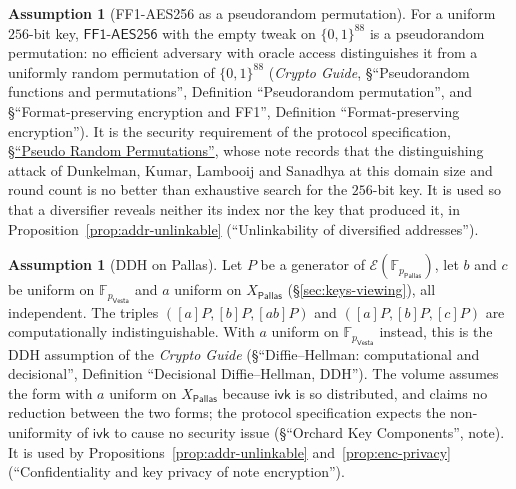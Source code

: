 \documentclass[11pt,a4paper]{article}
\theoremstyle{definition}
\newtheorem{assumption}[theorem]{Assumption}
\newcommand{\F}{\mathbb{F}}
\newcommand{\Pallas}{\ensuremath{\mathsf{Pallas}}}
\newcommand{\Vesta}{\ensuremath{\mathsf{Vesta}}}
\newcommand{\Ep}{\ensuremath{\mathcal{E}}}
\newcommand{\ivk}{\ensuremath{\mathsf{ivk}}}
\begin{document}
\begin{assumption}[FF1-AES256 as a pseudorandom permutation]%
\label{ass:ff1-prp}
For a uniform $256$-bit key, $\mathsf{FF1\text{-}AES256}$ with the empty
tweak on $\{0,1\}^{88}$ is a pseudorandom permutation: no efficient
adversary with oracle access distinguishes it from a uniformly random
permutation of $\{0,1\}^{88}$ (\emph{Crypto Guide}, \S``Pseudorandom
functions and permutations'', Definition ``Pseudorandom permutation'', and
\S``Format-preserving encryption and FF1'', Definition ``Format-preserving
encryption''). It is the security requirement of the protocol
specification,
\href{https://zips.z.cash/protocol/protocol.pdf#concreteprps}%
{\S``Pseudo Random Permutations''}, whose note records that
the distinguishing attack of Dunkelman, Kumar, Lambooij and Sanadhya at
this domain size and round count is no better than exhaustive search for
the $256$-bit key. It is used so that a
diversifier reveals neither its index nor the key that produced it, in
Proposition~\ref{prop:addr-unlinkable} (``Unlinkability of diversified
addresses'').
\end{assumption}

\begin{assumption}[DDH on Pallas]\label{ass:ddh-pallas}
Let $P$ be a generator of $\Ep(\F_{p_{\Pallas}})$, let $b$ and $c$ be uniform
on $\F_{p_{\Vesta}}$ and $a$ uniform on $X_{\Pallas}$
(\S\ref{sec:keys-viewing}), all independent. The triples
$([a]P, [b]P, [ab]P)$ and $([a]P, [b]P, [c]P)$ are computationally
indistinguishable. With $a$ uniform on $\F_{p_{\Vesta}}$ instead, this is
the DDH assumption of the \emph{Crypto Guide} (\S``Diffie--Hellman:
computational and decisional'', Definition ``Decisional Diffie--Hellman,
DDH''). The volume assumes the form with $a$ uniform on $X_{\Pallas}$
because $\ivk$ is so distributed, and claims no reduction between the two
forms; the protocol specification expects the non-uniformity of $\ivk$ to
cause no security issue (\S``Orchard Key Components'', note). It is used by
Propositions~\ref{prop:addr-unlinkable} and~\ref{prop:enc-privacy}
(``Confidentiality and key privacy of note encryption'').
\end{assumption}
\end{document}

